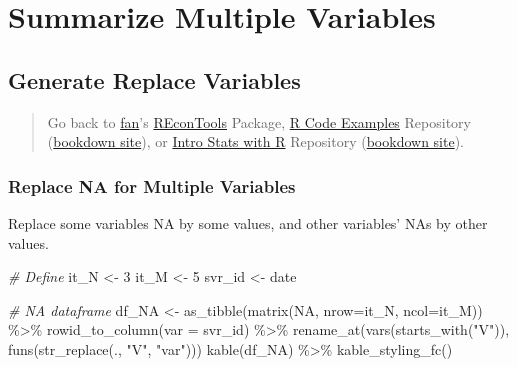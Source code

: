 \documentclass[
]{book}
\newenvironment{Shaded}{\begin{snugshade}}{\end{snugshade}}
\newcommand{\AttributeTok}[1]{\textcolor[rgb]{0.77,0.63,0.00}{#1}}
\newcommand{\CommentTok}[1]{\textcolor[rgb]{0.56,0.35,0.01}{\textit{#1}}}
\newcommand{\ConstantTok}[1]{\textcolor[rgb]{0.00,0.00,0.00}{#1}}
\newcommand{\DecValTok}[1]{\textcolor[rgb]{0.00,0.00,0.81}{#1}}
\newcommand{\FunctionTok}[1]{\textcolor[rgb]{0.00,0.00,0.00}{#1}}
\newcommand{\NormalTok}[1]{#1}
\newcommand{\OtherTok}[1]{\textcolor[rgb]{0.56,0.35,0.01}{#1}}
\newcommand{\SpecialCharTok}[1]{\textcolor[rgb]{0.00,0.00,0.00}{#1}}
\newcommand{\StringTok}[1]{\textcolor[rgb]{0.31,0.60,0.02}{#1}}
\begin{document}
\hypertarget{summarize-multiple-variables}{%
\section{Summarize Multiple Variables}\label{summarize-multiple-variables}}

\hypertarget{generate-replace-variables}{%
\subsection{Generate Replace Variables}\label{generate-replace-variables}}

\begin{quote}
Go back to \href{http://fanwangecon.github.io/}{fan}'s \href{https://fanwangecon.github.io/REconTools/}{REconTools} Package, \href{https://fanwangecon.github.io/R4Econ/}{R Code Examples} Repository (\href{https://fanwangecon.github.io/R4Econ/bookdown}{bookdown site}), or \href{https://fanwangecon.github.io/Stat4Econ/}{Intro Stats with R} Repository (\href{https://fanwangecon.github.io/Stat4Econ/bookdown}{bookdown site}).
\end{quote}

\hypertarget{replace-na-for-multiple-variables}{%
\subsubsection{Replace NA for Multiple Variables}\label{replace-na-for-multiple-variables}}

Replace some variables NA by some values, and other variables' NAs by other values.

\begin{Shaded}
\begin{Highlighting}[]
\CommentTok{\# Define}
\NormalTok{it\_N }\OtherTok{\textless{}{-}} \DecValTok{3}
\NormalTok{it\_M }\OtherTok{\textless{}{-}} \DecValTok{5}
\NormalTok{svr\_id }\OtherTok{\textless{}{-}} \StringTok{\textquotesingle{}date\textquotesingle{}}

\CommentTok{\# NA dataframe}
\NormalTok{df\_NA }\OtherTok{\textless{}{-}} \FunctionTok{as\_tibble}\NormalTok{(}\FunctionTok{matrix}\NormalTok{(}\ConstantTok{NA}\NormalTok{, }\AttributeTok{nrow=}\NormalTok{it\_N, }\AttributeTok{ncol=}\NormalTok{it\_M)) }\SpecialCharTok{\%\textgreater{}\%}
  \FunctionTok{rowid\_to\_column}\NormalTok{(}\AttributeTok{var =}\NormalTok{ svr\_id) }\SpecialCharTok{\%\textgreater{}\%}
  \FunctionTok{rename\_at}\NormalTok{(}\FunctionTok{vars}\NormalTok{(}\FunctionTok{starts\_with}\NormalTok{(}\StringTok{"V"}\NormalTok{)),}
            \FunctionTok{funs}\NormalTok{(}\FunctionTok{str\_replace}\NormalTok{(., }\StringTok{"V"}\NormalTok{, }\StringTok{"var"}\NormalTok{)))}
\FunctionTok{kable}\NormalTok{(df\_NA) }\SpecialCharTok{\%\textgreater{}\%}
  \FunctionTok{kable\_styling\_fc}\NormalTok{()}
\end{Highlighting}
\end{Shaded}
\end{document}
